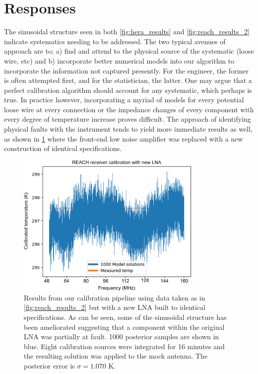 \section{Responses}\label{sec:responses}
The sinusoidal structure seen in both \cref{fig:hera_results} and \cref{fig:reach_results_2} indicate systematics needing to be addressed. The two typical avenues of approach are to; a) find and attend to the physical source of the systematic (loose wire, etc) and b) incorporate better numerical models into our algorithm to incorporate the information not captured presently. For the engineer, the former is often attempted first, and for the statistician, the latter. One may argue that a perfect calibration algorithm should account for any systematic, which perhaps is true. In practice however, incorporating a myriad of models for every potential loose wire at every connection or the impedance changes of every component with every degree of temperature increase proves difficult. The approach of identifying physical faults with the instrument tends to yield more immediate results as well, as shown in \cref{fig:lna_switched_reach_result} where the front-end low noise amplifier was replaced with a new construction of identical specifications.
\begin{figure}
    \centering
    \includegraphics[width=0.8\textwidth]{lna_switched_reach_result}
    \caption{Results from our calibration pipeline using data taken as in \cref{fig:reach_results_2} but with a new LNA built to identical specifications. As can be seen, some of the sinusoidal structure has been ameliorated suggesting that a component within the original LNA was partially at fault. 1000 posterior samples are shown in blue. Eight calibration sources were integrated for 16 minutes and the resulting solution was applied to the mock antenna. The posterior error is $\sigma = 1.070$ K.}
    \label{fig:lna_switched_reach_result}
\end{figure}

